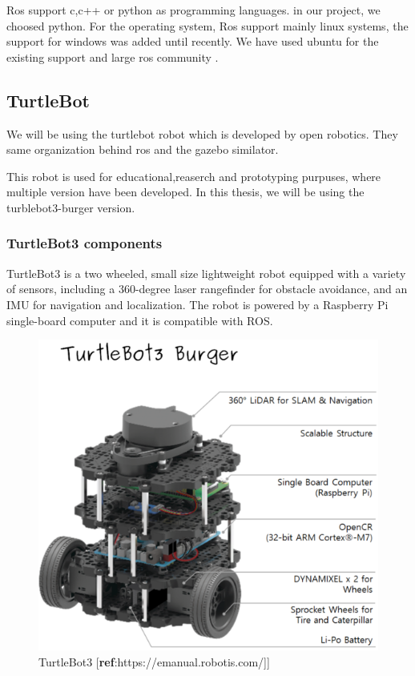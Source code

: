 \documentclass[12pt]{extarticle}
\begin{document}
Ros support  c,c++ or python as programming languages. in our project, we choosed python. 
For the operating system, Ros support mainly linux systems, the support for windows was added until recently. We have used ubuntu for the existing support and large ros community .







\subsection{TurtleBot}
We will be using the turtlebot robot which is developed by open robotics. They same organization behind ros and the gazebo similator.

This robot is used for educational,reaserch and prototyping purpuses, where multiple version have been developed. In this thesis, we will be using the turblebot3-burger version.\cite{turtlebot}

\subsubsection{TurtleBot3 components}
TurtleBot3 is a two wheeled, small  size  lightweight  robot  equipped with a variety of sensors, including a 360-degree laser rangefinder for obstacle avoidance, and an IMU for navigation and localization. The robot is powered by a Raspberry Pi single-board computer and it is compatible with ROS.
 \begin{figure}[h]  
\centering
\includegraphics[scale=0.4]{turtlebot3_burger_components.png}
\caption[TurtleBot3]{TurtleBot3 [\textbf{ref}:https://emanual.robotis.com/]]}
\end{figure}
\end{document}

